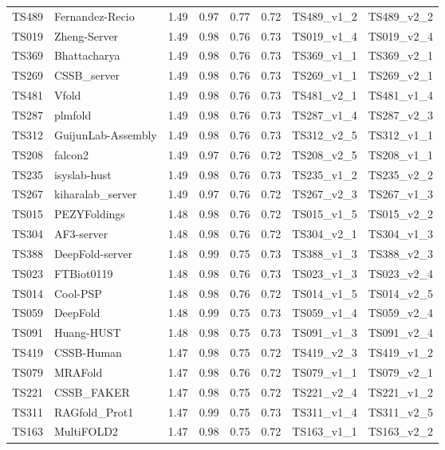 \begin{longtable}{llllllll}
TS489 & Fernandez-Recio & 1.49 & 0.97 & 0.77 & 0.72 & TS489\_v1\_2 & TS489\_v2\_2 \\ 
TS019 & Zheng-Server & 1.49 & 0.98 & 0.76 & 0.73 & TS019\_v1\_4 & TS019\_v2\_4 \\ 
TS369 & Bhattacharya & 1.49 & 0.98 & 0.76 & 0.73 & TS369\_v1\_1 & TS369\_v2\_1 \\ 
TS269 & CSSB\_server & 1.49 & 0.98 & 0.76 & 0.73 & TS269\_v1\_1 & TS269\_v2\_1 \\ 
TS481 & Vfold & 1.49 & 0.98 & 0.76 & 0.73 & TS481\_v2\_1 & TS481\_v1\_4 \\ 
TS287 & plmfold & 1.49 & 0.98 & 0.76 & 0.73 & TS287\_v1\_4 & TS287\_v2\_3 \\ 
TS312 & GuijunLab-Assembly & 1.49 & 0.98 & 0.76 & 0.73 & TS312\_v2\_5 & TS312\_v1\_1 \\ 
TS208 & falcon2 & 1.49 & 0.97 & 0.76 & 0.72 & TS208\_v2\_5 & TS208\_v1\_1 \\ 
TS235 & isyslab-hust & 1.49 & 0.98 & 0.76 & 0.73 & TS235\_v1\_2 & TS235\_v2\_2 \\ 
TS267 & kiharalab\_server & 1.49 & 0.97 & 0.76 & 0.72 & TS267\_v2\_3 & TS267\_v1\_3 \\ 
TS015 & PEZYFoldings & 1.48 & 0.98 & 0.76 & 0.72 & TS015\_v1\_5 & TS015\_v2\_2 \\ 
TS304 & AF3-server & 1.48 & 0.98 & 0.76 & 0.72 & TS304\_v2\_1 & TS304\_v1\_3 \\ 
TS388 & DeepFold-server & 1.48 & 0.99 & 0.75 & 0.73 & TS388\_v1\_3 & TS388\_v2\_3 \\ 
TS023 & FTBiot0119 & 1.48 & 0.98 & 0.76 & 0.73 & TS023\_v1\_3 & TS023\_v2\_4 \\ 
TS014 & Cool-PSP & 1.48 & 0.98 & 0.76 & 0.72 & TS014\_v1\_5 & TS014\_v2\_5 \\ 
TS059 & DeepFold & 1.48 & 0.99 & 0.75 & 0.73 & TS059\_v1\_4 & TS059\_v2\_4 \\ 
TS091 & Huang-HUST & 1.48 & 0.98 & 0.75 & 0.73 & TS091\_v1\_3 & TS091\_v2\_4 \\ 
TS419 & CSSB-Human & 1.47 & 0.98 & 0.75 & 0.72 & TS419\_v2\_3 & TS419\_v1\_2 \\ 
TS079 & MRAFold & 1.47 & 0.98 & 0.76 & 0.72 & TS079\_v1\_1 & TS079\_v2\_1 \\ 
TS221 & CSSB\_FAKER & 1.47 & 0.98 & 0.75 & 0.72 & TS221\_v2\_4 & TS221\_v1\_2 \\ 
TS311 & RAGfold\_Prot1 & 1.47 & 0.99 & 0.75 & 0.73 & TS311\_v1\_4 & TS311\_v2\_5 \\ 
TS163 & MultiFOLD2 & 1.47 & 0.98 & 0.75 & 0.72 & TS163\_v1\_1 & TS163\_v2\_2 \\ 

\end{longtable}
